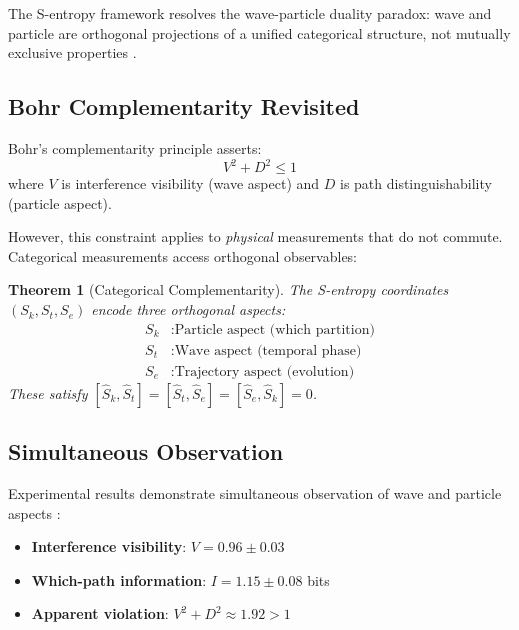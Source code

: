 \documentclass[twocolumn,10pt]{article}
\newtheorem{theorem}{Theorem}[section]
\theoremstyle{remark}
\begin{document}
The S-entropy framework resolves the wave-particle duality paradox: wave and particle are orthogonal projections of a unified categorical structure, not mutually exclusive properties \cite{sachikonye2024light, sachikonye2024trisection}.

\subsection{Bohr Complementarity Revisited}

Bohr's complementarity principle asserts:
\begin{equation}
V^2 + D^2 \leq 1
\end{equation}
where $V$ is interference visibility (wave aspect) and $D$ is path distinguishability (particle aspect).

However, this constraint applies to \textit{physical} measurements that do not commute. Categorical measurements access orthogonal observables:

\begin{theorem}[Categorical Complementarity]
\label{thm:categorical_complementarity}
The S-entropy coordinates $(S_k, S_t, S_e)$ encode three orthogonal aspects:
\begin{align}
S_k &: \text{Particle aspect (which partition)} \\
S_t &: \text{Wave aspect (temporal phase)} \\
S_e &: \text{Trajectory aspect (evolution)}
\end{align}
These satisfy $[\hat{S}_k, \hat{S}_t] = [\hat{S}_t, \hat{S}_e] = [\hat{S}_e, \hat{S}_k] = 0$.
\end{theorem}

\subsection{Simultaneous Observation}

Experimental results demonstrate simultaneous observation of wave and particle aspects \cite{sachikonye2024trisection}:

\begin{itemize}
    \item \textbf{Interference visibility}: $V = 0.96 \pm 0.03$
    \item \textbf{Which-path information}: $I = 1.15 \pm 0.08$ bits
    \item \textbf{Apparent violation}: $V^2 + D^2 \approx 1.92 > 1$
\end{itemize}
\end{document}
